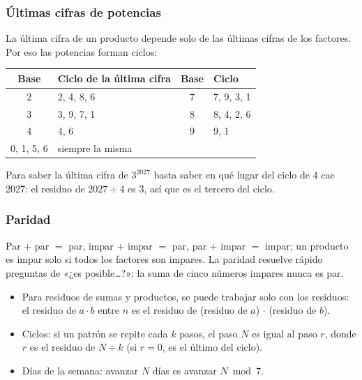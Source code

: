 \subsubsection{Últimas cifras de potencias}
La última cifra de un producto depende solo de las últimas cifras de los factores. Por eso las potencias forman ciclos:

\begin{center}\small
\begin{tabular}{@{}cl@{\qquad}cl@{}}
\toprule
\textbf{Base} & \textbf{Ciclo de la última cifra} & \textbf{Base} & \textbf{Ciclo}\\\midrule
2 & 2, 4, 8, 6 & 7 & 7, 9, 3, 1\\
3 & 3, 9, 7, 1 & 8 & 8, 4, 2, 6\\
4 & 4, 6 & 9 & 9, 1\\
0, 1, 5, 6 & siempre la misma & & \\\bottomrule
\end{tabular}
\end{center}

Para saber la última cifra de $3^{2027}$ basta saber en qué lugar del ciclo de 4 cae 2027: el residuo de $2027 \div 4$
es 3, así que es el tercero del ciclo.

\subsubsection{Paridad}
Par $+$ par $=$ par, impar $+$ impar $=$ par, par $+$ impar $=$ impar; un producto es impar solo si todos los factores
son impares. La paridad resuelve rápido preguntas de «¿es posible…?»: la suma de cinco números impares nunca es par.


\begin{regla}
\begin{itemize}
  \item Para residuos de sumas y productos, se puede trabajar solo con los residuos: el residuo de $a \cdot b$ entre $n$
  es el residuo de (residuo de $a$) $\cdot$ (residuo de $b$).
  \item Ciclos: si un patrón se repite cada $k$ pasos, el paso $N$ es igual al paso $r$, donde $r$ es el residuo de
  $N \div k$ (si $r = 0$, es el último del ciclo).
  \item Días de la semana: avanzar $N$ días es avanzar $N \bmod 7$.
\end{itemize}
\end{regla}

